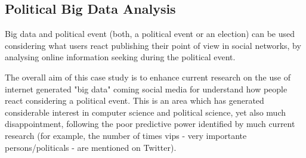 \subsection{Political Big Data Analysis}
\label{:sec:election-analysis}

Big data and political event  (both, a political event or an
election) can be used considering what users react publishing their point of
view in social networks, by analysing online information seeking during the
political event.

The overall aim of this case study is to enhance current research on the use of
internet generated "big data" coming social media for
understand how people react considering a political event.
This is an area which has generated considerable interest in computer science and political science, yet
also much disappointment, following the poor predictive power identified by much
current research (for example, the number of times vips - very importante
persons/politicals - are mentioned on Twitter).
            


